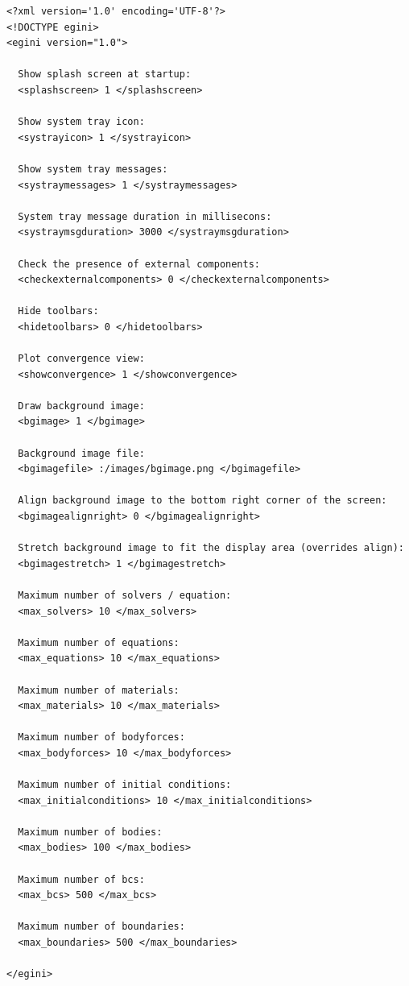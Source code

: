 \documentclass[a4paper,12pt]{article}
\begin{document}
\begin{footnotesize}
\begin{verbatim}
<?xml version='1.0' encoding='UTF-8'?>
<!DOCTYPE egini>
<egini version="1.0">

  Show splash screen at startup:
  <splashscreen> 1 </splashscreen>

  Show system tray icon:
  <systrayicon> 1 </systrayicon>

  Show system tray messages:
  <systraymessages> 1 </systraymessages>

  System tray message duration in millisecons:
  <systraymsgduration> 3000 </systraymsgduration>

  Check the presence of external components:
  <checkexternalcomponents> 0 </checkexternalcomponents>

  Hide toolbars:
  <hidetoolbars> 0 </hidetoolbars>

  Plot convergence view:
  <showconvergence> 1 </showconvergence>

  Draw background image:
  <bgimage> 1 </bgimage>

  Background image file:
  <bgimagefile> :/images/bgimage.png </bgimagefile>

  Align background image to the bottom right corner of the screen:
  <bgimagealignright> 0 </bgimagealignright>

  Stretch background image to fit the display area (overrides align):
  <bgimagestretch> 1 </bgimagestretch>

  Maximum number of solvers / equation:
  <max_solvers> 10 </max_solvers>

  Maximum number of equations:
  <max_equations> 10 </max_equations>

  Maximum number of materials:
  <max_materials> 10 </max_materials>

  Maximum number of bodyforces:
  <max_bodyforces> 10 </max_bodyforces>

  Maximum number of initial conditions:
  <max_initialconditions> 10 </max_initialconditions>

  Maximum number of bodies:
  <max_bodies> 100 </max_bodies>

  Maximum number of bcs:
  <max_bcs> 500 </max_bcs>

  Maximum number of boundaries:
  <max_boundaries> 500 </max_boundaries>

</egini>
\end{verbatim}
\end{footnotesize}
\end{document}

